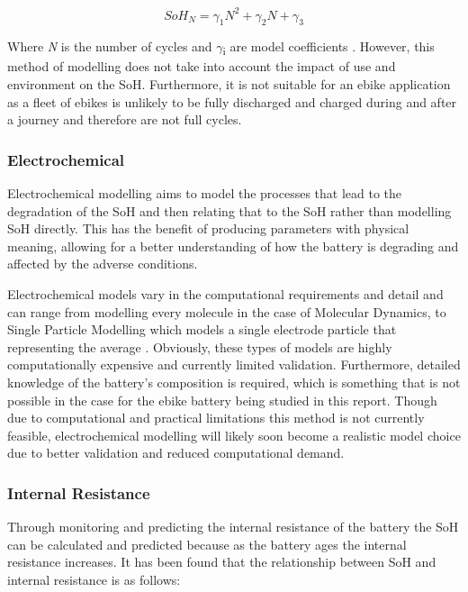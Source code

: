 \documentclass[a4paper, 10pt]{article}
\numberwithin{equation}{section}
\begin{document}
\begin{equation}
    SoH_{N} = \gamma_{1}N^{2}+\gamma_{2} N + \gamma_{3}
\label{eqn:SoH_cycles}
\end{equation}

Where \textit{N} is the number of cycles and $\gamma$\textsubscript{i} are model coefficients \cite{report:Regression_SoH}. 
However, this method of modelling does not take into account the impact of use and environment on the SoH. Furthermore, it is not suitable for an ebike application as a fleet of ebikes is unlikely to be fully discharged and charged during and after a journey and therefore are not full cycles.


\subsubsection{Electrochemical}
Electrochemical modelling aims to model the  processes that lead to the degradation of the SoH and then relating that to the SoH rather than modelling SoH directly. This has the benefit of producing parameters with physical meaning, allowing for a better understanding of how the battery is degrading and affected by the adverse conditions.

Electrochemical models vary in the computational requirements and detail and can range from modelling every molecule in the case of Molecular Dynamics, to Single Particle Modelling which models a single electrode particle that representing the average \cite{report:electro}. Obviously, these types of models are highly computationally expensive and currently limited validation. Furthermore, detailed knowledge of the battery's composition is required, which is something that is not possible in the case for the ebike battery being studied in this report. Though due to computational and practical limitations this method is not currently feasible, electrochemical modelling will likely soon become a realistic model choice due to better validation and reduced computational demand.

\subsubsection{Internal Resistance}

Through monitoring and predicting the internal resistance of the battery the SoH can be calculated and predicted because as the battery ages the internal resistance increases. It has been found that the relationship between SoH and internal resistance is as follows:
\end{document}
